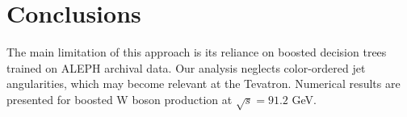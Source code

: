 \section{Conclusions}\label{sec:conclusions}

The main limitation of this approach is its reliance on boosted decision
trees trained on ALEPH archival data. Our analysis neglects
color-ordered jet angularities, which may become relevant at the
Tevatron. Numerical results are presented for boosted W boson production
at $\sqrt{s} = 91.2$ GeV.


